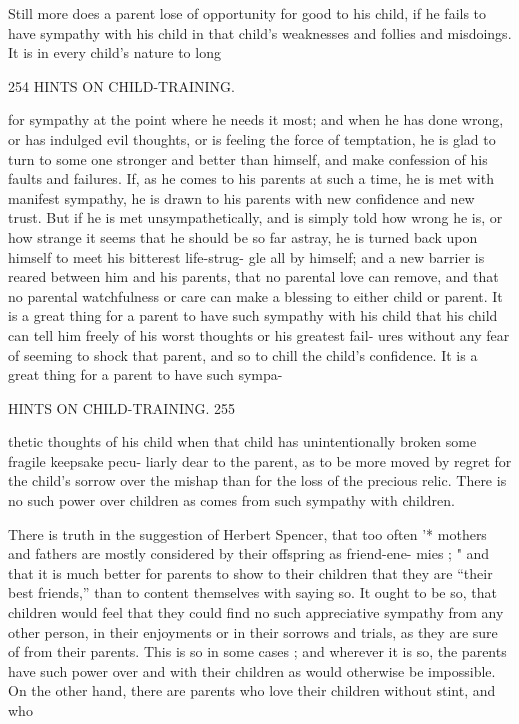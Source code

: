 \documentclass[
]{book}
\begin{document}
Still more does a parent lose of opportunity for good to his child, if he fails to have sympathy with his child in that child's weaknesses and follies and misdoings. It is in every child's nature to long

254 HINTS ON CHILD-TRAINING.

for sympathy at the point where he needs it most; and when he has done wrong, or has indulged evil thoughts, or is feeling the force of temptation, he is glad to turn to some one stronger and better than himself, and make confession of his faults and failures. If, as he comes to his parents at such a time, he is met with manifest sympathy, he is drawn to his parents with new confidence and new trust. But if he is met unsympathetically, and is simply told how wrong he is, or how strange it seems that he should be so far astray, he is turned back upon himself to meet his bitterest life-strug- gle all by himself; and a new barrier is reared between him and his parents, that no parental love can remove, and that no parental watchfulness or care can make a blessing to either child or parent. It is a great thing for a parent to have such sympathy with his child that his child can tell him freely of his worst thoughts or his greatest fail- ures without any fear of seeming to shock that parent, and so to chill the child's confidence. It is a great thing for a parent to have such sympa-

HINTS ON CHILD-TRAINING. 255

thetic thoughts of his child when that child has unintentionally broken some fragile keepsake pecu- liarly dear to the parent, as to be more moved by regret for the child's sorrow over the mishap than for the loss of the precious relic. There is no such power over children as comes from such sympathy with children.

There is truth in the suggestion of Herbert Spencer, that too often '* mothers and fathers are mostly considered by their offspring as friend-ene- mies ; " and that it is much better for parents to show to their children that they are ``their best friends,'' than to content themselves with saying so. It ought to be so, that children would feel that they could find no such appreciative sympathy from any other person, in their enjoyments or in their sorrows and trials, as they are sure of from their parents. This is so in some cases ; and wherever it is so, the parents have such power over and with their children as would otherwise be impossible. On the other hand, there are parents who love their children without stint, and who
\end{document}
